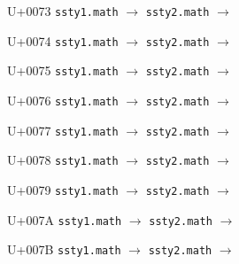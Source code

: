 \documentclass{article}
\begin{document}
\begin{substitutions}
\goodbreak

U+0073  \linebreak
    \texttt{ssty1.math} $\to$  \linebreak
    \texttt{ssty2.math} $\to$  

\goodbreak

U+0074  \linebreak
    \texttt{ssty1.math} $\to$  \linebreak
    \texttt{ssty2.math} $\to$  

\goodbreak

U+0075  \linebreak
    \texttt{ssty1.math} $\to$  \linebreak
    \texttt{ssty2.math} $\to$  

\goodbreak

U+0076  \linebreak
    \texttt{ssty1.math} $\to$  \linebreak
    \texttt{ssty2.math} $\to$  

\goodbreak

U+0077  \linebreak
    \texttt{ssty1.math} $\to$  \linebreak
    \texttt{ssty2.math} $\to$  

\goodbreak

U+0078  \linebreak
    \texttt{ssty1.math} $\to$  \linebreak
    \texttt{ssty2.math} $\to$  

\goodbreak

U+0079  \linebreak
    \texttt{ssty1.math} $\to$  \linebreak
    \texttt{ssty2.math} $\to$  

\goodbreak

U+007A  \linebreak
    \texttt{ssty1.math} $\to$  \linebreak
    \texttt{ssty2.math} $\to$  

\goodbreak

U+007B  \linebreak
    \texttt{ssty1.math} $\to$  \linebreak
    \texttt{ssty2.math} $\to$  


\end{substitutions}
\end{document}
